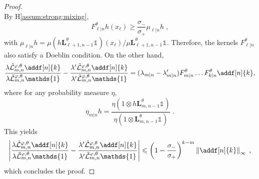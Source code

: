 \documentclass{article}
\newcommand{\1}{\mathbbm{1}}
\newcommand{\uk}[1]{\mathbf{L}_{#1}}
\def\1{\mathds{1}}
\newcommand{\eqsp}{\;}
\begin{document}
\begin{proof}
$$$$
By H\ref{assum:strong:mixing}, 
$$
 F^\theta_{\ell|n}h(x_\ell) \geqslant \frac{\sigma_-}{\sigma_+}\mu_{\ell|n}h\eqsp,
$$
with $\mu_{\ell|n}h = \mu(h\uk{\ell+1, n-1}^\theta\1_{})(x_\ell) / \mu\uk{\ell+1, n-1}^\theta\1_{}$. Therefore, the kernels $ F^\theta_{\ell|n}$ also satisfy a Doeblin condition. On the other hand,
$$
\frac{\lambda\tilde{\mathcal{L}}^{\varphi,\theta}_{m, n} \addf[n]{k}}{\lambda\tilde{\mathcal{L}}^{\varphi,\theta}_{m, n} \1_{}} - \frac{\lambda'\tilde{\mathcal{L}}^{\varphi,\theta}_{m, n} \addf[n]{k}}{\lambda'\tilde{\mathcal{L}}^{\varphi,\theta}_{m, n} \1_{}} = (\lambda_{m|n} - \lambda'_{m|n})F^\theta_{m|n}\ldots F^\theta_{k|n}\addf[n]{k},
$$
where for any probability measure $\eta$,
$$
\eta_{m|n}h = \frac{\eta(1\otimes h\uk{m, n-1}^\theta\1_{})}{\eta(1\otimes \uk{m, n-1}^\theta\1_{})}\eqsp.
$$
This yields
$$
\left|\frac{\lambda\tilde{\mathcal{L}}^{\varphi,\theta}_{m, n} \addf[n]{k}}{\lambda\tilde{\mathcal{L}}^{\varphi,\theta}_{m, n} \1_{}} - \frac{\lambda'\tilde{\mathcal{L}}^{\varphi,\theta}_{m, n} \addf[n]{k}}{\lambda'\tilde{\mathcal{L}}^{\varphi,\theta}_{m, n} \1_{}}\right|\leqslant  \left(1-\frac{\sigma_-}{\sigma_+}\right)^{k-m}\left\|\addf[n]{k}\right\|_\infty\eqsp,
$$
which concludes the proof.
 
\end{proof}
\end{document}
